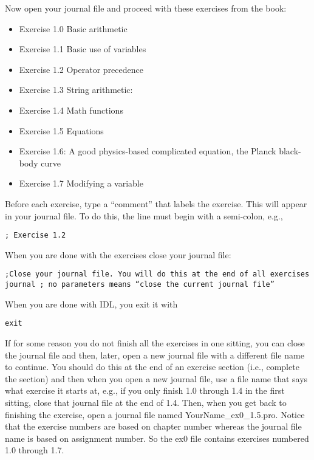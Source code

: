 \documentclass{article}
\begin{document}
\begin{spacing}{1.0}
Now open your journal file and proceed with these exercises from the book:

\begin{itemize}
    \item Exercise 1.0 Basic arithmetic
    \item Exercise 1.1 Basic use of variables
    \item Exercise 1.2 Operator precedence
    \item Exercise 1.3 String arithmetic: 
    \item Exercise 1.4 Math functions
    \item Exercise 1.5 Equations
    \item Exercise 1.6: A good physics-based complicated equation, the Planck black-body curve
    \item Exercise 1.7 Modifying a variable
\end{itemize}

Before each exercise, type a “comment” that labels the exercise.  This will appear in your journal file.
To do this, the line must begin with a semi-colon, e.g.,

\texttt{; Exercise 1.2}

When you are done with the exercises close your journal file:

\begin{tabbing}
\texttt{;Close your journal file.  You will do this at the end of all exercises\\    }
\texttt{journal                ; no parameters means “close the current journal file”}
\end{tabbing}

When you are done with IDL, you exit it with

\texttt{exit}

If for some reason you do not finish all the exercises in one sitting, you can close the journal file and then, later, open a new journal file with a different file name to continue.  You should do this at the end of an exercise section (i.e., complete the section) and then when you open a new journal file, use a file name that says what exercise it starts at, e.g., if you only finish 1.0 through 1.4 in the first sitting, close that journal file at the end of 1.4.  Then, when you get back to finishing the exercise, open a journal file named YourName\_ex0\_1.5.pro.   Notice that the exercise numbers are based on chapter number whereas the journal file name is based on assignment number.  So the ex0 file contains exercises numbered 1.0 through 1.7. 


\end{spacing}
\end{document}
